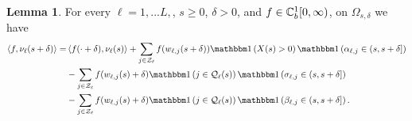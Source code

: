 \documentclass{article}
\theoremstyle{definition}
\newtheorem{lemma}[theorem]{Lemma}
\numberwithin{equation}{section}
\begin{document}
\begin{lemma}\label{lem_nufchange}
    For every $\ell=1,...L,$, $s\geq0$, $\delta>0$, and $f\in\mathbb{C}_b^{1}[0,\infty)$, on $\Omega_{s,\delta}$ we have
    \begin{align}\label{nufchange}
      \pair{f}{\nu_\ell(s+\delta)}= & \pair{f(\cdot+\delta)}{\nu_\ell(s)}+ \sum_{j\in\indexSet_\ell}f(w_{\ell,j}(s+\delta))\indic{X(s)>0}\indic{\arrivaltime_{\ell,j}\in(s,s+\delta]}\\
      & - \sum_{j\in\indexSet_\ell}f(w_{\ell,j}(s)+\delta)\indic{j\in\inque_\ell(s)} \indic{\renegtime_{\ell,j}\in(s,s+\delta]} \notag\\
&- \sum_{j\in\indexSet_\ell}f(w_{\ell,j}(s)+\delta)\indic{j\in\inque_\ell(s)}
\indic{\entrytime_{\ell,j}\in(s,s+\delta]}.\notag
    \end{align}
\end{lemma}
\end{document}
